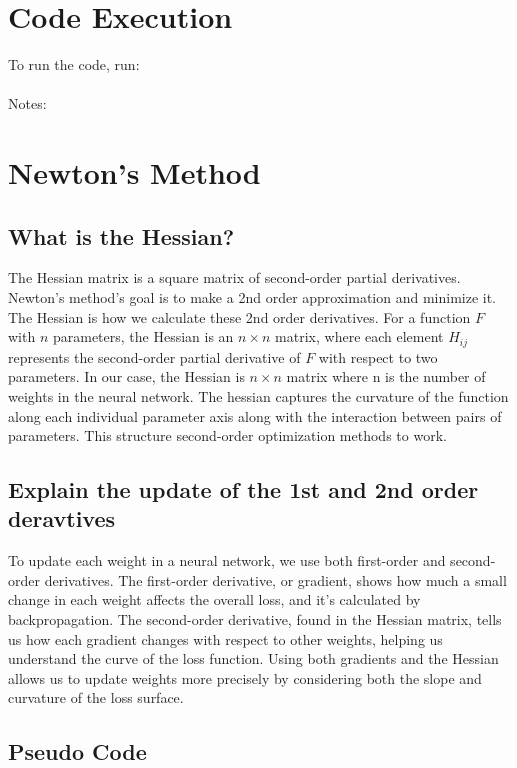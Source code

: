 \documentclass{article}
\begin{document}
\newpage

\section{Code Execution}

To run the code, run: \\ \\
Notes: 

\section{Newton's Method}

\subsection{What is the Hessian?}
The Hessian matrix is a square matrix of second-order partial derivatives. Newton's method's goal is to make a 2nd order approximation and minimize it. The Hessian is how we calculate these 2nd order derivatives. For a function \( F \) with \( n \) parameters, the Hessian is an \( n \times n \) matrix, where each element \( H_{ij} \) represents the second-order partial derivative of \( F \) with respect to two parameters. In our case, the Hessian is \( n \times n \) matrix where n is the number of weights in the neural network. The hessian captures the curvature of the function along each individual parameter axis along with the interaction between pairs of parameters. This structure second-order optimization methods to work.

\subsection{Explain the update of the 1st and 2nd order deravtives}
To update each weight in a neural network, we use both first-order and second-order derivatives. The first-order derivative, or gradient, shows how much a small change in each weight affects the overall loss, and it’s calculated by backpropagation. The second-order derivative, found in the Hessian matrix, tells us how each gradient changes with respect to other weights, helping us understand the curve of the loss function. Using both gradients and the Hessian allows us to update weights more precisely by considering both the slope and curvature of the loss surface.

\subsection{Pseudo Code}
\end{document}
